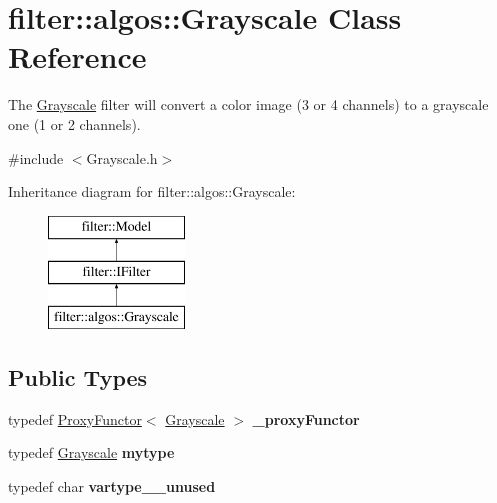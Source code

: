 \hypertarget{classfilter_1_1algos_1_1_grayscale}{}\section{filter\+:\+:algos\+:\+:Grayscale Class Reference}
\label{classfilter_1_1algos_1_1_grayscale}


The \hyperlink{classfilter_1_1algos_1_1_grayscale}{Grayscale} filter will convert a color image (3 or 4 channels) to a grayscale one (1 or 2 channels).  




{\ttfamily \#include $<$Grayscale.\+h$>$}

Inheritance diagram for filter\+:\+:algos\+:\+:Grayscale\+:\begin{figure}[H]
\begin{center}
\leavevmode
\includegraphics[height=3.000000cm]{db/dc6/classfilter_1_1algos_1_1_grayscale}
\end{center}
\end{figure}
\subsection*{Public Types}
\begin{DoxyCompactItemize}
\item 
\mbox{\label{classfilter_1_1algos_1_1_grayscale_a2e7d023ab891781b079fbe57a4763130}} 
typedef \hyperlink{class_proxy_functor}{Proxy\+Functor}$<$ \hyperlink{classfilter_1_1algos_1_1_grayscale}{Grayscale} $>$ {\bfseries \+\_\+proxy\+Functor}
\item 
\mbox{\label{classfilter_1_1algos_1_1_grayscale_a81fe6103c7c354a08eb74cad412bc397}} 
typedef \hyperlink{classfilter_1_1algos_1_1_grayscale}{Grayscale} {\bfseries mytype}
\item 
\mbox{\label{classfilter_1_1algos_1_1_grayscale_adcee9def3e07b6cdccc3ac07030a9c00}} 
typedef char {\bfseries vartype\+\_\+\+\_\+unused}
\end{DoxyCompactItemize}
